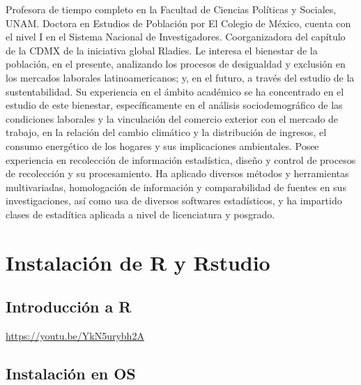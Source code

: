 \documentclass[
  letterpaper,
  DIV=11,
  numbers=noendperiod]{scrreprt}
\begin{document}
Profesora de tiempo completo en la Facultad de Ciencias Políticas y
Sociales, UNAM. Doctora en Estudios de Población por El Colegio de
México, cuenta con el nivel I en el Sistema Nacional de Investigadores.
Coorganizadora del capítulo de la CDMX de la iniciativa global Rladies.
Le interesa el bienestar de la población, en el presente, analizando los
procesos de desigualdad y exclusión en los mercados laborales
latinoamericanos; y, en el futuro, a través del estudio de la
sustentabilidad. Su experiencia en el ámbito académico se ha concentrado
en el estudio de este bienestar, específicamente en el análisis
sociodemográfico de las condiciones laborales y la vinculación del
comercio exterior con el mercado de trabajo, en la relación del cambio
climático y la distribución de ingresos, el consumo energético de los
hogares y sus implicaciones ambientales. Posee experiencia en
recolección de información estadística, diseño y control de procesos de
recolección y su procesamiento. Ha aplicado diversos métodos y
herramientas multivariadas, homologación de información y comparabilidad
de fuentes en sus investigaciones, así como usa de diversos softwares
estadísticos, y ha impartido clases de estadítica aplicada a nivel de
licenciatura y posgrado.


\hypertarget{instalaciuxf3n-de-r-y-rstudio}{%
\chapter*{Instalación de R y
Rstudio}\label{instalaciuxf3n-de-r-y-rstudio}}


\hypertarget{introducciuxf3n-a-r}{%
\section*{Introducción a R}\label{introducciuxf3n-a-r}}


\url{https://youtu.be/YkN5urybh2A}

\hypertarget{instalaciuxf3n-en-os}{%
\section*{Instalación en OS}\label{instalaciuxf3n-en-os}}
\end{document}
